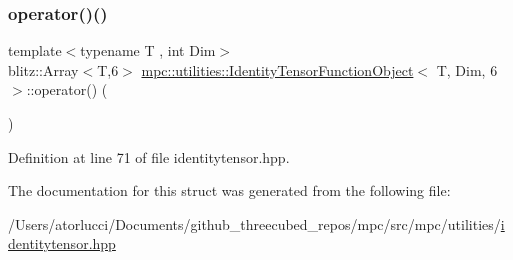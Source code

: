 \subsubsection{\texorpdfstring{operator()()}{operator()()}}
{\footnotesize\ttfamily template$<$typename T , int Dim$>$ \\
blitz\+::\+Array$<$T,6$>$ \mbox{\hyperlink{structmpc_1_1utilities_1_1_identity_tensor_function_object}{mpc\+::utilities\+::\+Identity\+Tensor\+Function\+Object}}$<$ T, Dim, 6 $>$\+::operator() (\begin{DoxyParamCaption}{ }\end{DoxyParamCaption})\hspace{0.3cm}{\ttfamily [inline]}}



Definition at line 71 of file identitytensor.\+hpp.



The documentation for this struct was generated from the following file\+:\begin{DoxyCompactItemize}
\item 
/\+Users/atorlucci/\+Documents/github\+\_\+threecubed\+\_\+repos/mpc/src/mpc/utilities/\mbox{\hyperlink{identitytensor_8hpp}{identitytensor.\+hpp}}\end{DoxyCompactItemize}
